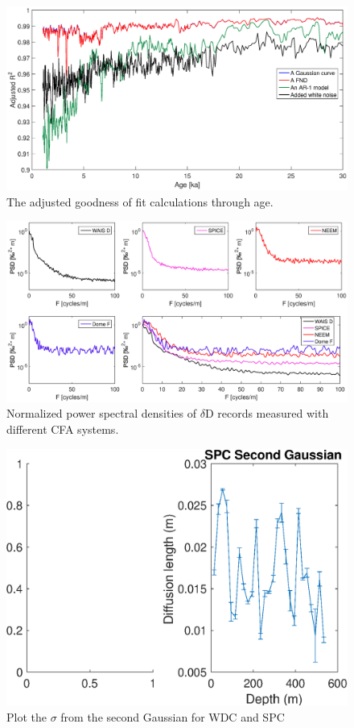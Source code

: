 \documentclass[draft, jgrga]{AGUTeX}
\begin{document}
\begin{figure}
	\includegraphics[width=.9\linewidth]{G_of_fit_1.eps}
	\caption{The adjusted goodness of fit calculations through age. } \label{G_of_fit_1}
\end{figure}

\begin{figure}
	\includegraphics[width=.9\linewidth]{CFA_spectra.eps}
	\caption{Normalized power spectral densities of $\delta$D records measured with different CFA systems. } \label{CFA_spectra}
\end{figure}



\begin{figure}
\includegraphics[width=.9\linewidth]{sigma2.eps}
\caption{Plot the $\sigma$ from the second Gaussian for WDC and SPC}\label{sigma2}
\end{figure}
\end{document}
